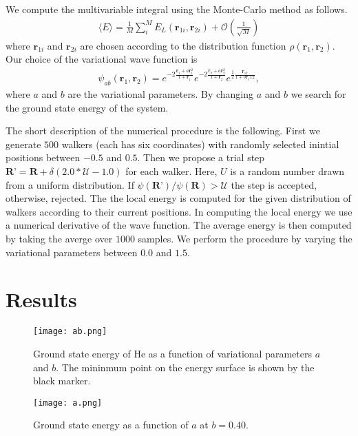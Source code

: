 \documentclass[aps,prb,twocolumn,showpacs,floatfix,superscriptaddress]{revtex4-1}
\begin{document}
We compute the multivariable integral using the Monte-Carlo method as follows.
\begin{eqnarray}
\langle E \rangle = \frac{1}{M}\sum_i^M E_L(\textbf{r}_{1i},\textbf{r}_{2i}) + \mathcal{O}(\frac{1}{\sqrt{M}})
\end{eqnarray}
where $\textbf{r}_{1i}$ and $\textbf{r}_{2i}$ are chosen according to the distribution function $\rho(\textbf{r}_{1}, \textbf{r}_{2})$.
Our choice of the variational wave function is 
\begin{eqnarray}
\psi_{ab}(\textbf{r}_1, \textbf{r}_2) = e^{-2\frac{\textbf{r}_1 + a\textbf{r}_1^2}{1 + \textbf{r}_1}}e^{-2\frac{\textbf{r}_2 + a\textbf{r}_2^2}{1 + \textbf{r}_2}}e^{\frac{1}{2}\frac{\textbf{r}_{12}}{1 + b\textbf{r}_r{12}}},
\end{eqnarray}
where $a$ and $b$ are the variational parameters. By changing $a$ and $b$ we search for the ground state energy of the system.

The short description of the numerical procedure is the following. First we generate $500$ walkers (each has six coordinates) with randomly selected inintial positions between $-0.5$ and $0.5$. Then we propose a trial step $\textbf{R'} = \textbf{R} + \delta (2.0 * \mathcal{U} -1.0)$ for each walker. Here, $\mathcal{}U$ is a random number drawn from a uniform distribution. If $\psi(\textbf{R'})/\psi(\textbf{R}) > \mathcal{U}$ the step is accepted, otherwise, rejected. The the local energy is computed for the given distribution of walkers according to their current positions. In computing the local energy we use a numerical derivative of the wave function. The average energy is then computed by taking the averge over $1000$ samples. We perform the procedure by varying the variational parameters between $0.0$ and $1.5$. 



\section{Results}

\begin{figure}
        \texttt{[image: ab.png]}
        \caption{Ground state energy of He as a function of variational parameters $a$ and $b$. The mininmum point on the energy surface is shown by the black marker.}
        \label{fig:ab}
\end{figure}

\begin{figure}
        \texttt{[image: a.png]}
        \caption{Ground state energy as a function of $a$ at $b=0.40$.}
        \label{fig:a}
\end{figure}
\end{document}
